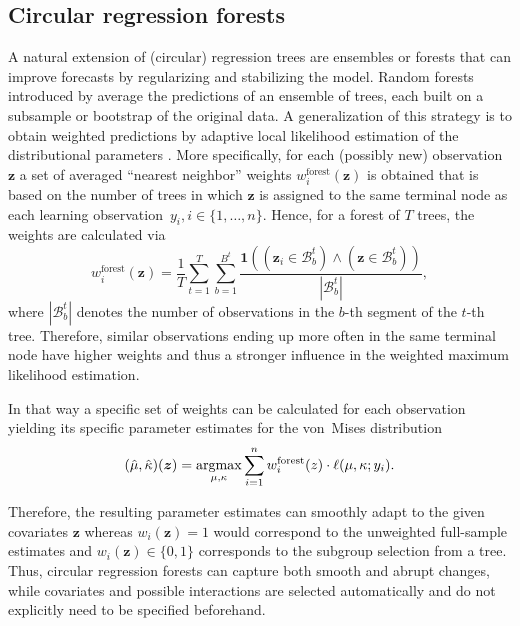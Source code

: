 \documentclass[nojss,shortnames]{jss}
\numberwithin{equation}{section}
\begin{document}
\subsection{Circular regression forests}
\label{sec:circforest} 
A natural extension of (circular) regression trees are ensembles or forests
that can improve forecasts by regularizing and stabilizing the model. Random
forests introduced by \cite{Breiman:2001} average the predictions of an
ensemble of trees, each built on a subsample or bootstrap of the original data.
A generalization of this strategy is to obtain weighted predictions by adaptive
local likelihood estimation of the distributional parameters
\citep[Section~2.3. of][]{Schlosser+Hothorn+Stauffer:2019,
Hothorn+Zeileis:2017}. More specifically, for each (possibly new)
observation~$\bm{z}$ a set of averaged ``nearest neighbor'' weights
$w_i^\text{forest}(\bm{z})$ is obtained that is based on the number of trees in
which $\bm{z}$ is assigned to the same terminal node as each learning
observation~\mbox{$y_i, i \in \{1,\ldots,n\}$}. Hence, for a forest of $T$ trees, the
weights are calculated via
\begin{equation}
  w^{\text{forest}}_i(\bm{z}) = \frac{1}{T} \sum_{t=1}^T \sum_{b=1}^{B^t}
  \frac{\mathbf{1}((\bm{z}_i \in \mathcal{B}^t_b) \land (\bm{z} \in \mathcal{B}^t_b))}{|\mathcal{B}^t_b|},
\end{equation}
where $|\mathcal{B}^t_b|$ denotes the number of observations in the $b$-th
segment of the $t$-th tree. Therefore, similar observations ending up more
often in the same terminal node have higher weights and thus a stronger
influence in the weighted maximum likelihood estimation.

In that way a specific set of weights can be calculated for each observation
yielding its specific parameter estimates for the von~Mises distribution
\begin{equation}
  (\hat{\mu},\hat{\kappa})(\bm{z}) = \operatorname{argmax}\displaylimits_{\mu,
  \kappa} \sum_{i=1}^n w_i^\text{forest}(z) \cdot \ell(\mu, \kappa; y_i). 
\end{equation}

Therefore, the resulting parameter estimates can smoothly adapt to the given
covariates $\bm{z}$ whereas $w_i(\bm{z}) = 1$ would correspond to the
unweighted full-sample estimates and \mbox{$w_i(\bm{z}) \in \{0, 1\}$} corresponds to
the subgroup selection from a tree. Thus, circular regression forests can
capture both smooth and abrupt changes, while covariates and possible
interactions are selected automatically and do not explicitly need to be
specified beforehand.
\end{document}
